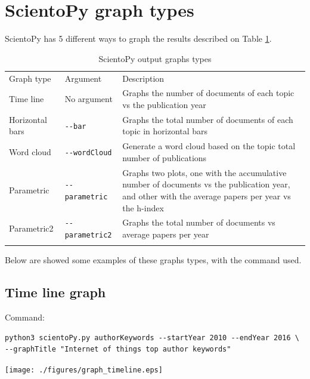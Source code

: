 \documentclass[10pt,letterpaper]{article}
\begin{document}
\newpage
\section{ScientoPy graph types}

ScientoPy has 5 different ways to graph the results described on Table \ref{table_graph_types}.

\begin{table}[!h]
	\centering
	\caption{ScientoPy output graphs types}
	\label{table_graph_types}

	\renewcommand{\arraystretch}{1.5}
	\begin{tabular}{ p{4cm} p{3cm} p{10cm}}
	\hline\noalign{\smallskip}
	Graph type     &  Argument & Description                             \\
	\noalign{\smallskip}\hline\noalign{\smallskip}                                                                         
	Time line      & No argument & Graphs the number of documents of each topic vs the publication year \\
	Horizontal bars  & \verb|--bar| & Graphs the total number of documents of each topic in horizontal bars \\
	Word cloud     & \verb|--wordCloud| & Generate a word cloud based on the topic total number of publications \\
	Parametric     & \verb|--parametric| & Graphs two plots, one with the accumulative number of documents vs the publication year, and other with the average papers per year vs the h-index\\
	Parametric2    & \verb|--parametric2| & Graphs the total number of documents vs average papers per year\\
	\noalign{\smallskip}\hline
	\end{tabular}
\end{table}

Below are showed some examples of these graphs types, with the command used.

\subsection{Time line graph}
Command: 
\begin{verbatim}
python3 scientoPy.py authorKeywords --startYear 2010 --endYear 2016 \
--graphTitle "Internet of things top author keywords" 
\end{verbatim}

\begin{center}
	\texttt{[image: ./figures/graph\_timeline.eps]}
\end{center}
\end{document}
